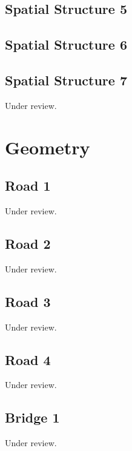 \documentclass{scrartcl}
\begin{document}
\subsection{Spatial Structure 5}
\label{sec:spatial_5}
\clearpage

\subsection{Spatial Structure 6}
\label{sec:spatial_6}
\clearpage

\subsection{Spatial Structure 7}
\label{sec:spatial_7}
Under review.%
\clearpage

\section{Geometry}

\subsection{Road 1}
\label{sec:road_1}
Under review.%
\clearpage

\subsection{Road 2}
\label{sec:road_2}
Under review.%
\clearpage

\subsection{Road 3}
\label{sec:road_3}
Under review.%
\clearpage

\subsection{Road 4}
\label{sec:road_4}
Under review.%
\clearpage

\subsection{Bridge 1}
\label{sec:bridge_1}
Under review.%
\clearpage
\end{document}
